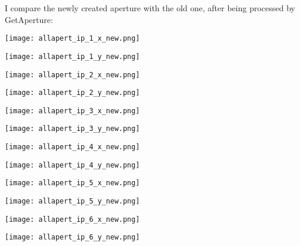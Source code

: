 \documentclass[11pt]{article}
\begin{document}
I compare the newly created aperture with the old one, after being processed by GetAperture:

\begin{minipage}{0.47\linewidth}
\texttt{[image: allapert\_ip\_1\_x\_new.png]}
\end{minipage}
\begin{minipage}{0.47\linewidth}
\texttt{[image: allapert\_ip\_1\_y\_new.png]}
\end{minipage}

\begin{minipage}{0.47\linewidth}
\texttt{[image: allapert\_ip\_2\_x\_new.png]}
\end{minipage}
\begin{minipage}{0.47\linewidth}
\texttt{[image: allapert\_ip\_2\_y\_new.png]}
\end{minipage}

\begin{minipage}{0.47\linewidth}
\texttt{[image: allapert\_ip\_3\_x\_new.png]}
\end{minipage}
\begin{minipage}{0.47\linewidth}
\texttt{[image: allapert\_ip\_3\_y\_new.png]}
\end{minipage}

\begin{minipage}{0.47\linewidth}
\texttt{[image: allapert\_ip\_4\_x\_new.png]}
\end{minipage}
\begin{minipage}{0.47\linewidth}
\texttt{[image: allapert\_ip\_4\_y\_new.png]}
\end{minipage}

\begin{minipage}{0.47\linewidth}
\texttt{[image: allapert\_ip\_5\_x\_new.png]}
\end{minipage}
\begin{minipage}{0.47\linewidth}
\texttt{[image: allapert\_ip\_5\_y\_new.png]}
\end{minipage}

\begin{minipage}{0.47\linewidth}
\texttt{[image: allapert\_ip\_6\_x\_new.png]}
\end{minipage}
\begin{minipage}{0.47\linewidth}
\texttt{[image: allapert\_ip\_6\_y\_new.png]}
\end{minipage}
\end{document}
